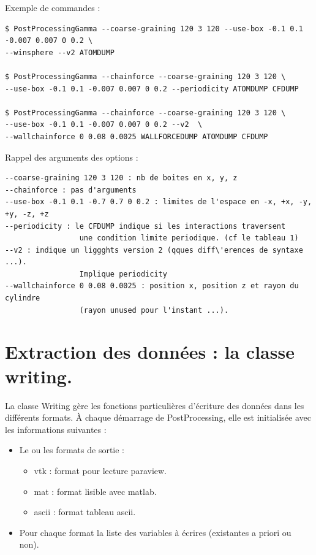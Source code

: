\documentclass[a4paper,12pt]{article}
\begin{document}
{{{Exemple de commandes : 
\begin{verbatim}
$ PostProcessingGamma --coarse-graining 120 3 120 --use-box -0.1 0.1 -0.007 0.007 0 0.2 \ 
--winsphere --v2 ATOMDUMP

$ PostProcessingGamma --chainforce --coarse-graining 120 3 120 \ 
--use-box -0.1 0.1 -0.007 0.007 0 0.2 --periodicity ATOMDUMP CFDUMP

$ PostProcessingGamma --chainforce --coarse-graining 120 3 120 \
--use-box -0.1 0.1 -0.007 0.007 0 0.2 --v2  \
--wallchainforce 0 0.08 0.0025 WALLFORCEDUMP ATOMDUMP CFDUMP
\end{verbatim}

Rappel des arguments des options : 
\begin{verbatim}
--coarse-graining 120 3 120 : nb de boites en x, y, z
--chainforce : pas d'arguments
--use-box -0.1 0.1 -0.7 0.7 0 0.2 : limites de l'espace en -x, +x, -y, +y, -z, +z
--periodicity : le CFDUMP indique si les interactions traversent 
                 une condition limite periodique. (cf le tableau 1)
--v2 : indique un liggghts version 2 (qques diff\'erences de syntaxe ...). 
                 Implique periodicity
--wallchainforce 0 0.08 0.0025 : position x, position z et rayon du cylindre 
                 (rayon unused pour l'instant ...).
\end{verbatim}


\newpage
\section{Extraction des donn\'ees : la classe writing.}
La classe Writing g\`ere les fonctions particuli\`eres d'\'ecriture des donn\'ees dans les diff\'erents formats. \`A chaque d\'emarrage de PostProcessing, elle est initialis\'ee avec les informations suivantes : 
\begin{itemize}
\item Le ou les formats de sortie : \begin{itemize}
  \item vtk : format pour lecture paraview. 
  \item mat : format lisible avec matlab.
  \item ascii : format tableau ascii. \end{itemize}
\item Pour chaque format la liste des variables \`a \'ecrires (existantes a priori ou non).
\end{itemize}

}}}
\end{document}
